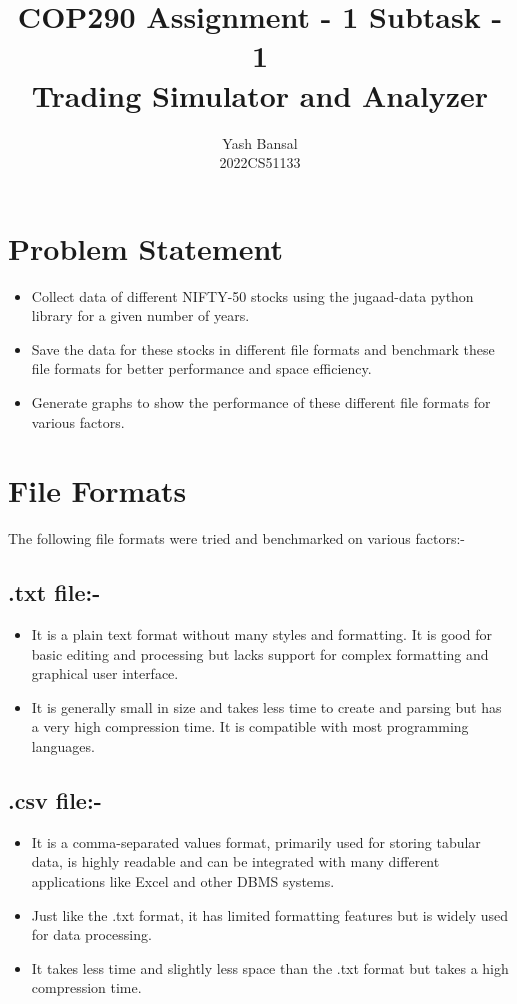 \documentclass[11pt]{article}
\title{{\fontsize{21pt}{18pt}\selectfont COP290 Assignment - 1 Subtask - 1} \\ Trading Simulator and Analyzer}
\author{Yash Bansal \\ 2022CS51133}
\date{}
\begin{document}
\maketitle

\section{Problem Statement}

\begin{itemize}
    \item Collect data of different NIFTY-50 stocks using the jugaad-data python library for a given number of years.
    \item Save the data for these stocks in different file formats and benchmark these file formats for better performance and space efficiency.
    \item Generate graphs to show the performance of these different file formats for various factors.
\end{itemize}

\section{File Formats}
The following file formats were tried and benchmarked on various factors:-

\subsection{.txt file:-}
\begin{itemize}
    \item It is a plain text format without many styles and formatting. It is good for basic editing and processing but lacks support for complex formatting and graphical user interface.
    \item It is generally small in size and takes less time to create and parsing but has a very high compression time. It is compatible with most programming languages.
\end{itemize}

\subsection{.csv file:-}
\begin{itemize}
    \item It is a comma-separated values format, primarily used for storing tabular data, is highly readable and can be integrated with many different applications like Excel and other DBMS systems.
    \item Just like the .txt format, it has limited formatting features but is widely used for data processing.
    \item It takes less time and slightly less space than the .txt format but takes a high compression time.
\end{itemize}
\end{document}
